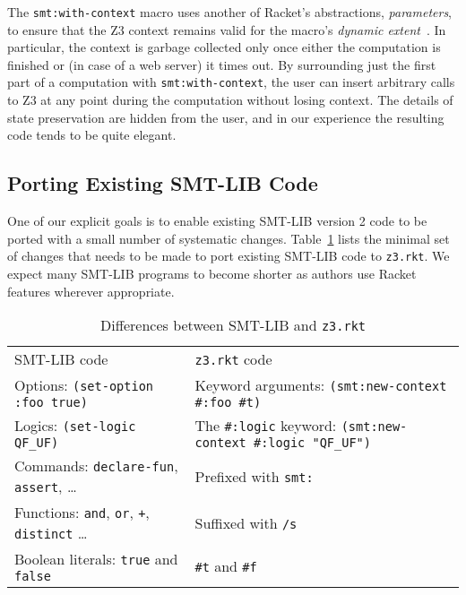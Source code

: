 The \texttt{smt:with-context} macro uses another of Racket's abstractions,
\textit{parameters}, to ensure that the Z3 context remains valid for the
macro's \textit{dynamic extent}~\cite{delimitedcontrol}. In particular, the
context is garbage collected only once either the computation is finished or
(in case of a web server) it times out. By surrounding just the first part of
a computation with \texttt{smt:with-context}, the user can insert arbitrary
calls to Z3 at any point during the computation without losing context. The
details of state preservation are hidden from the user, and in our experience
the resulting code tends to be quite elegant.

\subsection{Porting Existing SMT-LIB Code}
\label{sec:porting-smt-lib}

One of our explicit goals is to enable existing SMT-LIB version 2 code to be
ported with a small number of systematic changes. Table~\ref{table:smt-porting}
lists the minimal set of changes that needs to be made to port
existing SMT-LIB code to \texttt{z3.rkt}. We expect many SMT-LIB programs
to become shorter as authors use Racket features wherever appropriate.

\begin{table}[hbt]
\caption{Differences between SMT-LIB and \texttt{z3.rkt}}
\label{table:smt-porting}
\begin{center}
\begin{tabularx}{0.91\textwidth}{lX}
\hline\noalign{\smallskip}
SMT-LIB code & \texttt{z3.rkt} code \\
\noalign{\smallskip}
\hline
\noalign{\smallskip}
Options: \texttt{(set-option :foo true)} & Keyword arguments: \newline \texttt{(smt:new-context \#:foo \#t)} \\

Logics: \texttt{(set-logic QF\_UF)} & The \texttt{\#:logic} keyword: \newline \texttt{(smt:new-context \#:logic "QF\_UF")} \\

Commands: \texttt{declare-fun}, \texttt{assert}, \ldots & Prefixed with \texttt{smt:} \\

Functions: \texttt{and}, \texttt{or}, \texttt{+}, \texttt{distinct} \ldots & Suffixed with \texttt{/s} \\

Boolean literals: \texttt{true} and \texttt{false} & \texttt{\#t} and \texttt{\#f} \\

\hline
\end{tabularx}
\end{center}
\end{table}
